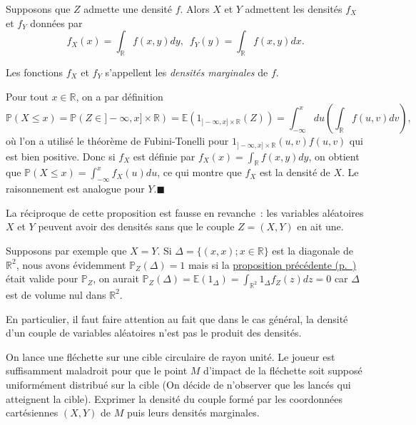 \begin{proposition}\label{II-loimarg}

Supposons que \(Z\) admette une densité \(f\). Alors \(X\) et \(Y\)
admettent les densités \(f_X\) et \(f_Y\) données par
\[f_X(x) = \int_\mathbb{R}f(x,y) dy,\,\,\, f_Y(y) = \int_\mathbb{R}f(x,y) dx.\]

Les fonctions \(f_X\) et \(f_Y\) s'appellent les \emph{densités
marginales} de \(f\).
\end{proposition}

\begin{preuve}
Pour tout \(x \in \mathbb{R}\), on a par définition
\[ \mathbb{P}(X \leq x) = \mathbb{P}(Z \in ]-\infty,x] \times \mathbb{R}) = \mathbb{E}(1_{]-\infty,x] \times \mathbb{R}}(Z)) = \int_{-\infty}^x du \left(\int_\mathbb{R}f(u,v) dv\right),\]
où l'on a utilisé le théorème de Fubini-Tonelli pour
\(1_{]-\infty,x] \times \mathbb{R}}(u,v)f(u,v)\) qui est bien positive.
Donc si \(f_X\) est définie par \(f_X(x) = \int_\mathbb{R}f(x,y) dy\),
on obtient que \(\mathbb{P}(X \leq x) = \int_{-\infty}^x f_X(u) du\), ce
qui montre que \(f_X\) est la densité de \(X\). Le raisonnement est
analogue pour \(Y\).\hfill$\blacksquare$
\end{preuve}

\begin{remarque}[{Réciproque\,?}]\label{II-ruxe9ciproque}

La réciproque de cette proposition est fausse en revanche~: les
variables aléatoires \(X\) et \(Y\) peuvent avoir des densités sans que
le couple \(Z = (X, Y )\) en ait une.

Supposons par exemple que \(X = Y\). Si
\(\Delta = \{(x,x) ; x\in \mathbb{R}\}\) est la diagonale de
\(\mathbb{R}^2\), nous avons évidemment \(\mathbb{P}_Z(\Delta) = 1\)
mais si la \protect\hyperref[II-esperancegvect]{proposition
précédente (p.~\pageref*{II-esperancegvect})} était valide pour
\(\mathbb{P}_Z\), on aurait
\(\mathbb{P}_Z(\Delta) = \mathbb{E}(1_\Delta) = \int_{\mathbb{R}^2} 1_\Delta f_Z(z)dz = 0\)
car \(\Delta\) est de volume nul dans \(\mathbb{R}^2\).

En particulier, il faut faire attention au fait que dans le cas général,
la densité d'un couple de variables aléatoires n'est pas le produit des
densités.
\end{remarque}

\label{II-exo-flechette}
On lance une fléchette sur une cible circulaire de rayon unité. Le
joueur est suffisamment maladroit pour que le point \(M\) d'impact de la
fléchette soit supposé uniformément distribué sur la cible (On décide de
n'observer que les lancés qui atteignent la cible). Exprimer la densité
du couple formé par les coordonnées cartésiennes \((X,Y)\) de \(M\) puis
leurs densités marginales.

